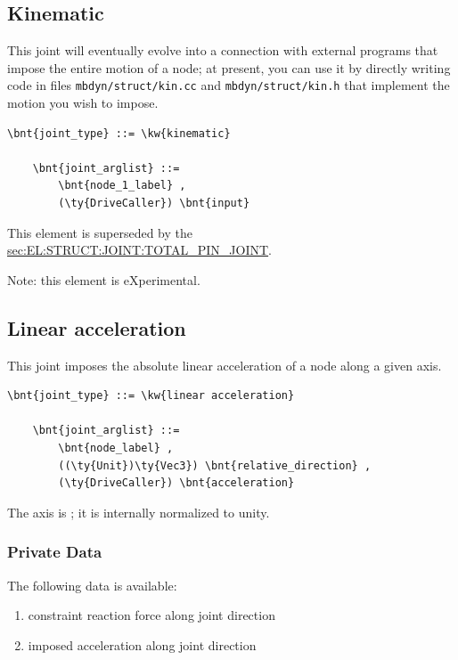


\subsection{Kinematic}
This joint will eventually evolve into a connection with external programs
that impose the entire motion of a node; at present, you can use it
by directly writing code in files \verb;mbdyn/struct/kin.cc; and
\verb;mbdyn/struct/kin.h; that implement the motion you wish to impose.
\begin{Verbatim}[commandchars=\\\{\}]
    \bnt{joint_type} ::= \kw{kinematic}

    \bnt{joint_arglist} ::= 
        \bnt{node_1_label} ,
        (\ty{DriveCaller}) \bnt{input}
\end{Verbatim}
This element is superseded by the
\hyperref{\kw{total pin joint}}{\kw{total pin joint}, see Section~}{}{sec:EL:STRUCT:JOINT:TOTAL_PIN_JOINT}.

Note: this element is eXperimental.

\subsection{Linear acceleration}
This joint imposes the absolute linear acceleration of a node
along a given axis.
\begin{Verbatim}[commandchars=\\\{\}]
    \bnt{joint_type} ::= \kw{linear acceleration}

    \bnt{joint_arglist} ::=
        \bnt{node_label} ,
        ((\ty{Unit})\ty{Vec3}) \bnt{relative_direction} , 
        (\ty{DriveCaller}) \bnt{acceleration}
\end{Verbatim}
The axis is ; it is internally normalized to unity.

\subsubsection{Private Data}
The following data is available:
\begin{enumerate}
\item {} constraint reaction force along joint direction
\item {} imposed acceleration along joint direction
\end{enumerate}

